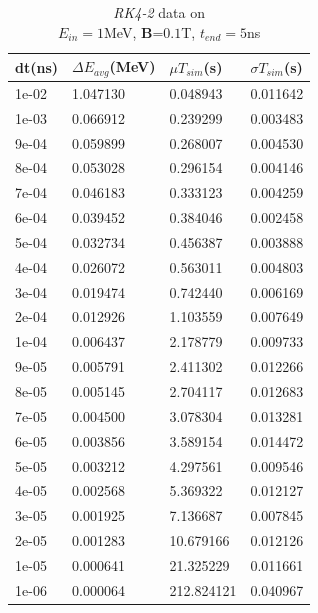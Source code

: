 \documentclass{book}
\begin{document}
\begin{table}[H]
    \centering
    \begin{tabular}{|l|l|l|l|}
    \hline
    dt(ns)       & $\Delta E_{avg}$(MeV) & $\mu T_{sim}$(s)    & $\sigma T_{sim}$(s) \\\hline
        1e-02 & 1.047130     & 0.048943   & 0.011642 \\\hline
        1e-03 & 0.066912     & 0.239299   & 0.003483 \\\hline
        9e-04 & 0.059899     & 0.268007   & 0.004530 \\\hline
        8e-04 & 0.053028     & 0.296154   & 0.004146 \\\hline
        7e-04 & 0.046183     & 0.333123   & 0.004259 \\\hline
        6e-04 & 0.039452     & 0.384046   & 0.002458 \\\hline
        5e-04 & 0.032734     & 0.456387   & 0.003888 \\\hline
        4e-04 & 0.026072     & 0.563011   & 0.004803 \\\hline
        3e-04 & 0.019474     & 0.742440   & 0.006169 \\\hline
        2e-04 & 0.012926     & 1.103559   & 0.007649 \\\hline
        1e-04 & 0.006437     & 2.178779   & 0.009733 \\\hline
        9e-05 & 0.005791     & 2.411302   & 0.012266 \\\hline
        8e-05 & 0.005145     & 2.704117   & 0.012683 \\\hline
        7e-05 & 0.004500     & 3.078304   & 0.013281 \\\hline
        6e-05 & 0.003856     & 3.589154   & 0.014472 \\\hline
        5e-05 & 0.003212     & 4.297561   & 0.009546 \\\hline
        4e-05 & 0.002568     & 5.369322   & 0.012127 \\\hline
        3e-05 & 0.001925     & 7.136687   & 0.007845 \\\hline
        2e-05 & 0.001283     & 10.679166  & 0.012126 \\\hline
        1e-05 & 0.000641     & 21.325229  & 0.011661 \\\hline
        1e-06 & 0.000064     & 212.824121 & 0.040967 \\\hline
    \end{tabular}
    \caption{\textit{RK4-2} data on \\$E_{in}=1$MeV, \textbf{B}=$0.1$T, $t_{end}=5$ns}
    \label{tab:rk2_mag_table}
\end{table}
\end{document}
